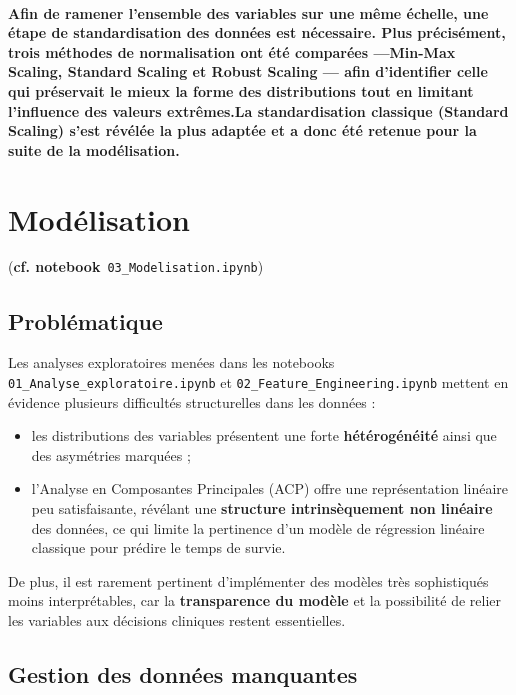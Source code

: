 \documentclass[12pt,a4paper]{article}
\begin{document}
\paragraph{
Afin de ramener l’ensemble des variables sur une même échelle, une étape de standardisation des données est nécessaire. Plus précisément, trois méthodes de normalisation ont été comparées —Min-Max Scaling, Standard Scaling et Robust Scaling — afin d’identifier celle qui préservait le mieux la forme des distributions tout en limitant l’influence des valeurs extrêmes.La standardisation classique (Standard Scaling) s’est révélée la plus adaptée et a donc été retenue pour la suite de la modélisation.}



\section{Modélisation}
\noindent(\textbf{cf. notebook}~\texttt{03\_Modelisation.ipynb})
\subsection{Problématique}

Les analyses exploratoires menées dans les notebooks \texttt{01\_Analyse\_exploratoire.ipynb} et \texttt{02\_Feature\_Engineering.ipynb} mettent en évidence plusieurs difficultés structurelles dans les données :
\begin{itemize}
    \item les distributions des variables présentent une forte \textbf{hétérogénéité} ainsi que des asymétries marquées ;
    \item l’Analyse en Composantes Principales (ACP) offre une représentation linéaire peu satisfaisante, révélant une \textbf{structure intrinsèquement non linéaire} des données, ce qui limite la pertinence d’un modèle de régression linéaire classique pour prédire le temps de survie.
\end{itemize}


De plus, il est rarement pertinent d’implémenter des modèles très sophistiqués moins interprétables, car la \textbf{transparence du modèle} et la possibilité de relier les variables aux décisions cliniques restent essentielles.


\subsection{Gestion des données manquantes}
\end{document}
